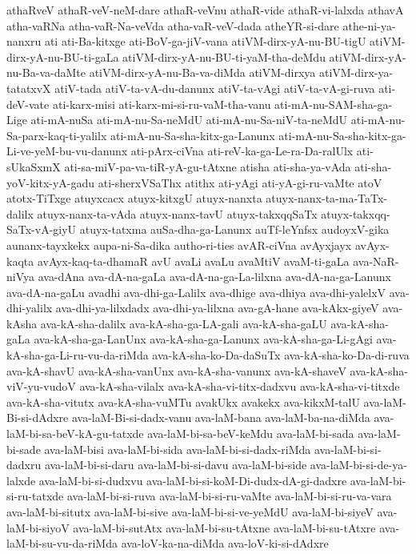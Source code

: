 {athaRveV
athaR-veV-neM-dare
athaR-veVnu
athaR-vide
athaR-vi-lalxda
athavA
atha-vaRNa
atha-vaR-Na-veVda
atha-vaR-veV-dada
atheYR-si-dare
athe-ni-ya-nanxru
ati
ati-Ba-kitxge
ati-BoV-ga-jiV-vana
atiVM-dirx-yA-nu-BU-tigU
atiVM-dirx-yA-nu-BU-ti-gaLa
atiVM-dirx-yA-nu-BU-ti-yaM-tha-deMdu
atiVM-dirx-yA-nu-Ba-va-daMte
atiVM-dirx-yA-nu-Ba-va-diMda
atiVM-dirxya
atiVM-dirx-ya-tatatxvX
atiV-tada
atiV-ta-vA-du-danunx
atiV-ta-vAgi
atiV-ta-vA-gi-ruva
ati-deV-vate
ati-karx-misi
ati-karx-mi-si-ru-vaM-tha-vanu
ati-mA-nu-SAM-sha-ga-Lige
ati-mA-nuSa
ati-mA-nu-Sa-neMdU
ati-mA-nu-Sa-niV-ta-neMdU
ati-mA-nu-Sa-parx-kaq-ti-yalilx
ati-mA-nu-Sa-sha-kitx-ga-Lanunx
ati-mA-nu-Sa-sha-kitx-ga-Li-ve-yeM-bu-vu-danunx
ati-pArx-ciVna
ati-reV-ka-ga-Le-ra-Da-ralUlx
ati-sUkaSxmX
ati-sa-miV-pa-va-tiR-yA-gu-tAtxne
atisha
ati-sha-ya-vAda
ati-sha-yoV-kitx-yA-gadu
ati-sherxVSaThx
atithx
ati-yAgi
ati-yA-gi-ru-vaMte
atoV
atotx-TiTxge
atuyxcacx
atuyx-kitxgU
atuyx-nanxta
atuyx-nanx-ta-ma-TaTx-dalilx
atuyx-nanx-ta-vAda
atuyx-nanx-tavU
atuyx-takxqqSaTx
atuyx-takxqq-SaTx-vA-giyU
atuyx-tatxma
auSa-dha-ga-Lanunx
auTf-leYnfsx
audoyxV-gika
aunanx-tayxkekx
aupa-ni-Sa-dika
autho-ri-ties
avAR-ciVna
avAyxjayx
avAyx-kaqta
avAyx-kaq-ta-dhamaR
avU
avaLi
avaLu
avaMtiV
avaM-ti-gaLa
ava-NaR-niVya
ava-dAna
ava-dA-na-gaLa
ava-dA-na-ga-La-lilxna
ava-dA-na-ga-Lanunx
ava-dA-na-gaLu
avadhi
ava-dhi-ga-Lalilx
ava-dhige
ava-dhiya
ava-dhi-yalelxV
ava-dhi-yalilx
ava-dhi-ya-lilxdadx
ava-dhi-ya-lilxna
ava-gA-hane
ava-kAkx-giyeV
ava-kAsha
ava-kA-sha-dalilx
ava-kA-sha-ga-LA-gali
ava-kA-sha-gaLU
ava-kA-sha-gaLa
ava-kA-sha-ga-LanUnx
ava-kA-sha-ga-Lanunx
ava-kA-sha-ga-Li-gAgi
ava-kA-sha-ga-Li-ru-vu-da-riMda
ava-kA-sha-ko-Da-daSuTx
ava-kA-sha-ko-Da-di-ruva
ava-kA-shavU
ava-kA-sha-vanUnx
ava-kA-sha-vanunx
ava-kA-shaveV
ava-kA-sha-viV-yu-vudoV
ava-kA-sha-vilalx
ava-kA-sha-vi-titx-dadxvu
ava-kA-sha-vi-titxde
ava-kA-sha-vitutx
ava-kA-sha-vuMTu
avakUkx
avakekx
ava-kikxM-talU
ava-laM-Bi-si-dAdxre
ava-laM-Bi-si-dadx-vanu
ava-laM-bana
ava-laM-ba-na-diMda
ava-laM-bi-sa-beV-kA-gu-tatxde
ava-laM-bi-sa-beV-keMdu
ava-laM-bi-sada
ava-laM-bi-sade
ava-laM-bisi
ava-laM-bi-sida
ava-laM-bi-si-dadx-riMda
ava-laM-bi-si-dadxru
ava-laM-bi-si-daru
ava-laM-bi-si-davu
ava-laM-bi-side
ava-laM-bi-si-de-ya-lalxde
ava-laM-bi-si-dudxvu
ava-laM-bi-si-koM-Di-dudx-dA-gi-dadxre
ava-laM-bi-si-ru-tatxde
ava-laM-bi-si-ruva
ava-laM-bi-si-ru-vaMte
ava-laM-bi-si-ru-va-vara
ava-laM-bi-situtx
ava-laM-bi-sive
ava-laM-bi-si-ve-yeMdU
ava-laM-bi-siyeV
ava-laM-bi-siyoV
ava-laM-bi-sutAtx
ava-laM-bi-su-tAtxne
ava-laM-bi-su-tAtxre
ava-laM-bi-su-vu-da-riMda
ava-loV-ka-na-diMda
ava-loV-ki-si-dAdxre
}
